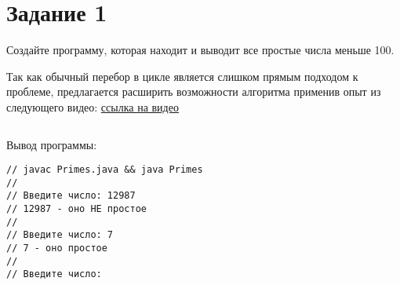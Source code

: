 \chapter*{Задание 1}
\label{ch:Task1}
Создайте программу, которая находит и выводит все простые числа меньше 100.

Так как обычный перебор в цикле является слишком прямым подходом к проблеме, предлагается расширить возможности алгоритма применив опыт из следующего видео: \href{https://www.youtube.com/watch?v=tBzaMfV94uA}{ссылка на видео}

\inputminted{java}{../src/part1/Primes.java}

Вывод программы:
\begin{verbatim}
// javac Primes.java && java Primes
//
// Введите число: 12987
// 12987 - оно НЕ простое
// 
// Введите число: 7
// 7 - оно простое
// 
// Введите число:

\end{verbatim}

\endinput

